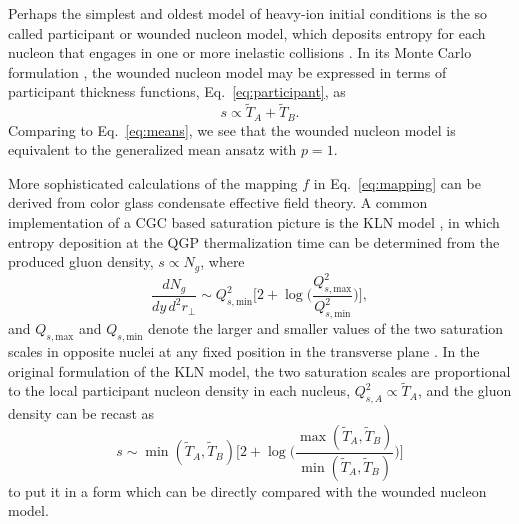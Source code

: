 \documentclass[aps,prc,reprint,amsmath,nofootinbib]{revtex4-1}
\newcommand{\T}{\tilde{T}}
\newcommand{\Qs}[1]{Q_{s,\text{#1}}}
\begin{document}
Perhaps the simplest and oldest model of heavy-ion initial conditions is the so called participant or wounded nucleon model, which deposits entropy for each nucleon that engages in one or more inelastic collisions \cite{Bialas:1976ed}.
In its Monte Carlo formulation \cite{Shor:1988vk, Wang:1991hta, Alver:2008aq, Broniowski:2007nz}, the wounded nucleon model may be expressed in terms of participant thickness functions, Eq.~\eqref{eq:participant}, as
\begin{equation}
  s \propto \T_A + \T_B.
  \label{eq:wn}
\end{equation}
Comparing to Eq.~\eqref{eq:means}, we see that the wounded nucleon model is equivalent to the generalized mean ansatz with $p=1$.

More sophisticated calculations of the mapping $f$ in Eq.~\eqref{eq:mapping} can be derived from color glass condensate effective field theory.
A common implementation of a CGC based saturation picture is the KLN model \cite{Kharzeev:2001yq, Kharzeev:2002ei, Kharzeev:2004if}, in which entropy deposition at the QGP thermalization time can be determined from the produced gluon density, $s \propto N_g$, where
\begin{equation}
  \frac{dN_g}{dy\,d^2r_\perp} \sim \Qs{min}^2 \biggl[
    2 + \log \biggl(\frac{\Qs{max}^2}{\Qs{min}^2} \biggr)
  \biggr],
  \label{eq:kln}
\end{equation}
and $\Qs{max}$ and $\Qs{min}$ denote the larger and smaller values of the two saturation scales in opposite nuclei at any fixed position in the transverse plane \cite{Drescher:2006ca}.
In the original formulation of the KLN model, the two saturation scales are proportional to the local participant nucleon density in each nucleus, $Q^2_{s,A} \propto \T_A$, and the gluon density can be recast as
\begin{equation}
  s \sim \min(\T_A, \T_B) \biggl[
    2 + \log \biggl(\frac{\max(\T_A,\T_B)}{\min(\T_A,\T_B)}\biggr)
  \biggr]
\end{equation}
to put it in a form which can be directly compared with the wounded nucleon model.
\end{document}
